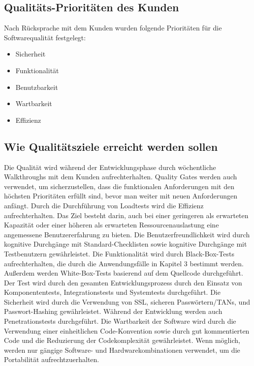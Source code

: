 	\subsection{Qualitäts-Prioritäten des Kunden}
		
    Nach Rücksprache mit dem Kunden wurden folgende Prioritäten für die Softwarequalität festgelegt:

		\begin{itemize}
			\item Sicherheit 
            \item Funktionalität
           	\item Benutzbarkeit
            \item Wartbarkeit
            \item Effizienz

		\end{itemize}

	\subsection{Wie Qualitätsziele erreicht werden sollen}
	
	Die Qualität wird während der Entwicklungsphase durch wöchentliche Walkthroughs mit dem Kunden aufrechterhalten. Quality Gates werden auch verwendet, um sicherzustellen, dass die funktionalen Anforderungen mit den höchsten Prioritäten erfüllt sind, bevor man weiter mit neuen Anforderungen anfängt.
	\linebreak
    Durch die Durchführung von Loadtests wird die Effizienz aufrechterhalten. Das Ziel besteht darin, auch bei einer geringeren als erwarteten Kapazität oder einer höheren als erwarteten Ressourcenauslastung eine angemessene Benutzererfahrung zu bieten. 
	\linebreak
	Die Benutzerfreundlichkeit wird durch kognitive Durchgänge mit Standard-Checklisten sowie kognitive Durchgänge mit Testbenutzern gewährleistet.
	\linebreak
	Die Funktionalität wird durch Black-Box-Tests aufrechterhalten, die durch die Anwendungsfälle in Kapitel 3 bestimmt werden. Außerdem werden White-Box-Tests basierend auf dem Quellcode durchgeführt. Der Test wird durch den gesamten Entwicklungsprozess durch den Einsatz von Komponententests, Integrationstests und Systemtests durchgeführt.
	\linebreak
	Die Sicherheit wird durch die Verwendung von SSL, sicheren Passwörtern/TANs, und Passwort-Hashing gewährleistet. Während der Entwicklung werden auch Penetrationstests durchgeführt.
	\linebreak
	Die Wartbarkeit der Software wird durch die Verwendung einer einheitlichen Code-Konvention sowie durch gut kommentierten Code und die Reduzierung der Codekomplexität gewährleistet.
	\linebreak
	Wenn möglich, werden nur gängige Software- und Hardwarekombinationen verwendet, um die Portabilität aufrechtzuerhalten.
